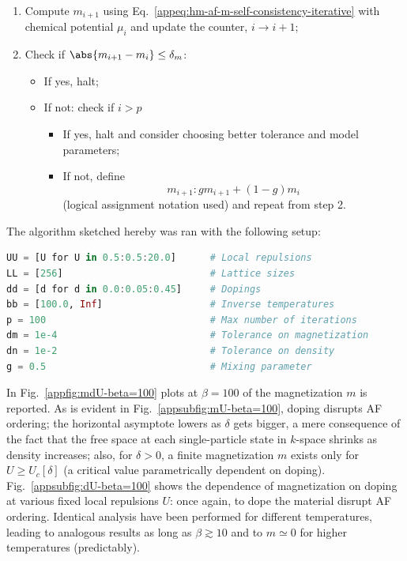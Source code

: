 \begin{enumerate}
\begin{enumerate}
		\[
			\delta n(\mu_i) = 0
		\]
		Then $\mu_i$ is the chemical potential which, at step $i$ with HFP $m_i$, realizes the best approximation of density $n$;
	\end{enumerate}
	\item Compute $m_{i+1}$ using Eq.~\eqref{appeq:hm-af-m-self-consistency-iterative} with chemical potential $\mu_i$ and update the counter, $i \to i+1$;
	\item Check if $\abs{m_{i+1}-m_i} \le \delta_m$:
	\begin{itemize}
		\item If yes, halt;
		\item If not: check if $i > p$
		\begin{itemize}
			\item If yes, halt and consider choosing better tolerance and model parameters;
			\item If not, define 
			\[
				m_{i+1} \colon g m_{i+1} + (1-g) m_i
			\]
			(logical assignment notation used) and repeat from step 2.
		\end{itemize}
	\end{itemize}
\end{enumerate}

The algorithm sketched hereby was ran with the following setup:
\begin{lstlisting}[language=julia]
UU = [U for U in 0.5:0.5:20.0]      # Local repulsions
LL = [256]             				# Lattice sizes
dd = [d for d in 0.0:0.05:0.45]     # Dopings
bb = [100.0, Inf]				    # Inverse temperatures
p = 100                             # Max number of iterations
dm = 1e-4                           # Tolerance on magnetization
dn = 1e-2                           # Tolerance on density
g = 0.5                             # Mixing parameter
\end{lstlisting}
In Fig.~\ref{appfig:mdU-beta=100} plots at $\beta=100$ of the magnetization $m$ is reported. As is evident in Fig.~\ref{appsubfig:mU-beta=100}, doping disrupts AF ordering; the horizontal asymptote lowers as $\delta$ gets bigger, a mere consequence of the fact that the free space at each single-particle state in $k$-space shrinks as density increases; also, for $\delta > 0$, a finite magnetization $m$ exists only for $U \ge U_c[\delta]$ (a critical value parametrically dependent on doping). Fig.~\ref{appsubfig:dU-beta=100} shows the dependence of magnetization on doping at various fixed local repulsions $U$: once again, to dope the material disrupt AF ordering. Identical analysis have been performed for different temperatures, leading to analogous results as long as $\beta \gtrsim 10$ and to $m \simeq 0$ for higher temperatures (predictably).


